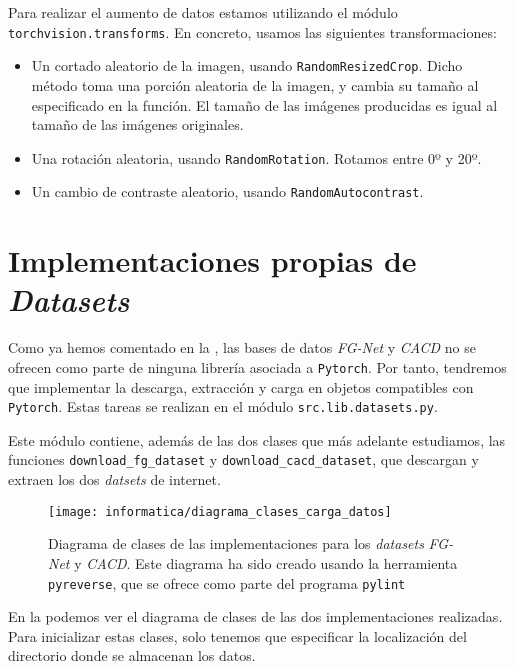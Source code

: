 Para realizar el aumento de datos estamos utilizando el módulo \lstinline{torchvision.transforms}. En concreto, usamos las siguientes transformaciones:

\begin{itemize}
	\item Un cortado aleatorio de la imagen, usando \lstinline{RandomResizedCrop}. Dicho método toma una porción aleatoria de la imagen, y cambia su tamaño al especificado en la función. El tamaño de las imágenes producidas es igual al tamaño de las imágenes originales.
	\item Una rotación aleatoria, usando \lstinline{RandomRotation}. Rotamos entre 0º y 20º.
	\item Un cambio de contraste aleatorio, usando \lstinline{RandomAutocontrast}.
\end{itemize}

\section{Implementaciones propias de \textit{Datasets}} \label{isec:datasets_customs}

Como ya hemos comentado en la , las bases de datos \textit{FG-Net} y \textit{CACD} no se ofrecen como parte de ninguna librería asociada a \lstinline{Pytorch}. Por tanto, tendremos que implementar la descarga, extracción y carga en objetos compatibles con \lstinline{Pytorch}. Estas tareas se realizan en el módulo \lstinline{src.lib.datasets.py}.

Este módulo contiene, además de las dos clases que más adelante estudiamos, las funciones \lstinline{download_fg_dataset} y \lstinline{download_cacd_dataset}, que descargan y extraen los dos \textit{datsets} de internet.

\begin{figure}[H]
	\centering
	\texttt{[image: informatica/diagrama\_clases\_carga\_datos]}
	\caption{Diagrama de clases de las implementaciones para los \textit{datasets} \textit{FG-Net} y \textit{CACD}. Este diagrama ha sido creado usando la herramienta \lstinline{pyreverse}, que se ofrece como parte del programa \lstinline{pylint}}
	\label{img:diagrama_clases_datasets}
\end{figure}

En la  podemos ver el diagrama de clases de las dos implementaciones realizadas. Para inicializar estas clases, solo tenemos que especificar la localización del directorio donde se almacenan los datos.

